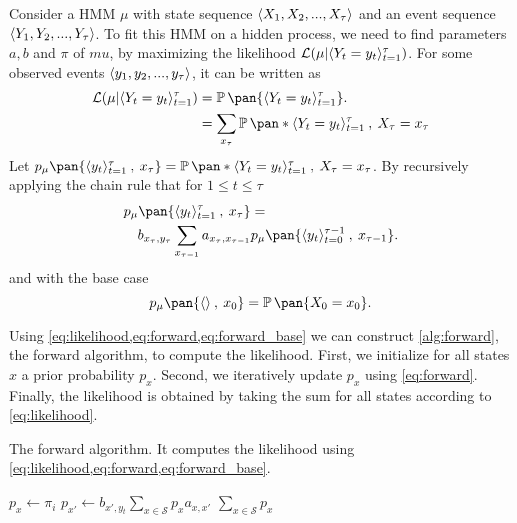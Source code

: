 Consider a HMM \(\mu\) with state sequence \(\langle X_1, X_2, ..., X_\tau\rangle\) and an event sequence \(\langle Y_1, Y_2, ..., Y_\tau\rangle\). To fit this HMM on a hidden process, we need to find parameters \(a, b\) and \(\pi\) of \(mu\), by maximizing the likelihood \(\mathcal{L}(\mu | \langle Y_t = y_t\rangle_{t=1}^\tau)\). For some observed events \(\langle y_1, y_2, ..., y_\tau\rangle\), it can be written as
\begin{equation}\label{eq:likelihood}
    \begin{aligned}
        \mathcal{L}(\mu | \seq{Y_t = y_t}_{t=1}^\tau)
        &= \prob\pan{\seq{Y_t = y_t}_{t=1}^\tau}. \\
        &= \sum_{x_\tau} \prob\pan*{\seq{Y_t = y_t}_{t=1}^{\tau} \:,\: X_\tau = x_\tau}
    \end{aligned}
\end{equation}
Let \(p_\mu\pan{\seq{y_t}_{t=1}^{\tau} \:,\: x_\tau} = \prob\pan*{\seq{Y_t = y_t}_{t=1}^{\tau} \:,\: X_\tau = x_\tau}\).
By recursively applying the chain rule that for \(1
\leq t \leq \tau\)
\begin{equation}\label{eq:forward}
    \begin{multlined}
        p_\mu\pan{\seq{y_t}_{t=1}^{\tau} \:,\: x_\tau} = \\
        b_{x_\tau,y_\tau} \sum_{x_{\tau-1}} a_{x_{\tau}, x_{\tau-1}} p_\mu\pan{\seq{y_t}_{t=0}^{\tau-1}\:,\: x_{\tau-1}}.
    \end{multlined}
\end{equation}
and with the base case
\begin{equation}\label{eq:forward_base}
    p_\mu\pan{\seq{} \:,\: x_0} = \prob\pan{X_0 = x_0}.
\end{equation}

Using \cref{eq:likelihood,eq:forward,eq:forward_base} we can construct \cref{alg:forward}, the forward algorithm, to compute the likelihood. First, we initialize for all states \(x\) a prior probability \(p_x\). Second, we iteratively update \(p_x\) using \cref{eq:forward}. Finally, the likelihood is obtained by taking the sum for all states according to \cref{eq:likelihood}.

\begin{algorithm}
    \caption{The forward algorithm. It computes the likelihood using \cref{eq:likelihood,eq:forward,eq:forward_base}.}\label{alg:forward}
    \begin{algorithmic}[1]
                \State $p_x \gets \pi_i$
            \EndFor
                    \State $p_{x'} \gets b_{x',y_t} \sum_{x \in \mathcal{S}} p_x a_{x, x'}$
                \EndFor
            \EndFor
            \State \Return $\sum_{x \in \mathcal{S}} p_x$
        \EndProcedure
    \end{algorithmic}
\end{algorithm}

